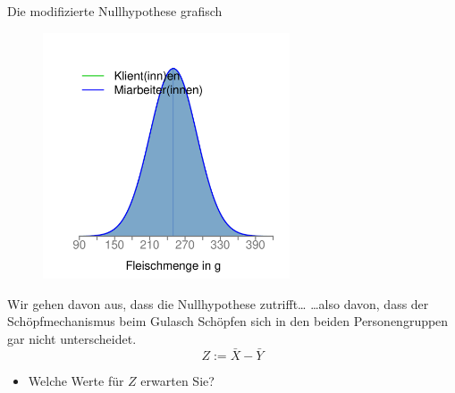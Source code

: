 \documentclass[usenames,dvipsnames,handout]{beamer}
\begin{document}
\begin{frame}{Die modifizierte Nullhypothese grafisch}
\begin{figure}[ht]
 	\centering
 	      \includegraphics[width=0.65\textwidth]{nullhyp.pdf}
 	\end{figure}
\end{frame}

\begin{frame}{Wir gehen davon aus, dass die Nullhypothese zutrifft\dots}
\dots also davon, dass der Schöpfmechanismus beim Gulasch Schöpfen sich in den beiden Personengruppen gar nicht unterscheidet.
$$Z:=\bar{X}-\bar{Y}$$
\begin{itemize}
\item{Welche Werte für $Z$ erwarten Sie?}
\end{itemize}
\end{frame}

\end{document}

